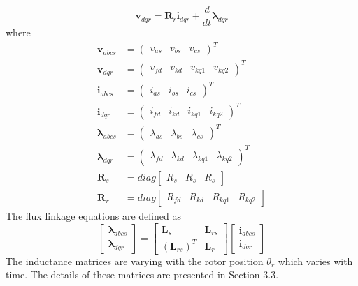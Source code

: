 \begin{equation} 
	\mathbf{v}_{dqr} = \mathbf{R}_r \mathbf{i}_{dqr} + \frac{d}{dt} \boldsymbol{\lambda}_{dqr}
	\label{eq:voltage_rotor}
\end{equation}
%
where
%
\begin{align}
  \mathbf{v}_{abcs} &= 
  \begin{pmatrix}
    v_{as} & v_{bs} & v_{cs}
  \end{pmatrix}^T \\
  \mathbf{v}_{dqr} &= 
  \begin{pmatrix}
    v_{fd} & v_{kd} & v_{kq1} & v_{kq2}
  \end{pmatrix}^T \\
  \mathbf{i}_{abcs} &= 
  \begin{pmatrix}
    i_{as} & i_{bs} & i_{cs}
  \end{pmatrix}^T \\
  \mathbf{i}_{dqr} &= 
  \begin{pmatrix}
    i_{fd} & i_{kd} & i_{kq1} & i_{kq2}
  \end{pmatrix}^T \\
  \boldsymbol{\lambda}_{abcs} &= 
  \begin{pmatrix}
    \lambda_{as} & \lambda_{bs} & \lambda_{cs}
  \end{pmatrix}^T \\
  \boldsymbol{\lambda}_{dqr} &= 
  \begin{pmatrix}
    \lambda_{fd} & \lambda_{kd} & \lambda_{kq1} & \lambda_{kq2}
  \end{pmatrix}^T \\
  \mathbf{R}_s &= diag
  \begin{bmatrix}
    R_s & R_s & R_s 
  \end{bmatrix} \\
  \mathbf{R}_r &= diag
  \begin{bmatrix}
    R_{fd} & R_{kd} & R_{kq1} & R_{kq2}
  \end{bmatrix}
\end{align}
%
The flux linkage equations are defined as
%
\begin{equation} 
	\begin{bmatrix}
		\boldsymbol{\lambda}_{abcs} \\
		\boldsymbol{\lambda}_{dqr}
	\end{bmatrix}
	=
	\begin{bmatrix}
		\mathbf{L}_s & \mathbf{L}_{rs} \\
		{(\mathbf{L}_{rs})}^{T} & \mathbf{L}_r
	\end{bmatrix}
	\begin{bmatrix}
		\mathbf{i}_{abcs} \\
		\mathbf{i}_{dqr}
  \end{bmatrix}
  \label{eq:stator_rotor_fluxes}
\end{equation}
%
The inductance matrices are varying with the rotor position $\theta_r$ which varies with time. The details of these matrices are presented in \cite{krause2002} Section 3.3.

